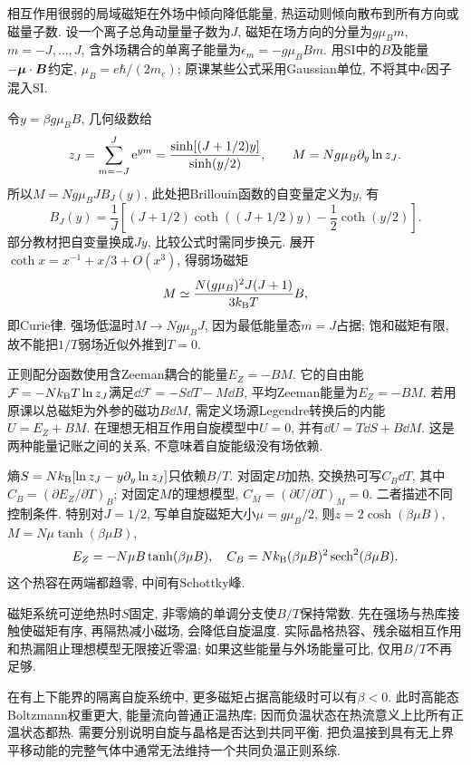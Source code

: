 \label{ch:magnetism}
相互作用很弱的局域磁矩在外场中倾向降低能量, 热运动则倾向散布到所有方向或磁量子数. 设一个离子总角动量量子数为$J$, 磁矩在场方向的分量为$g\mu_Bm$, $m=-J,\ldots,J$, 含外场耦合的单离子能量为$\epsilon_m=-g\mu_BBm$. 用SI中的$B$及能量$-\boldsymbol{\mu}\cdot\boldsymbol{B}$约定, $\mu_B=e\hbar/(2m_e)$; 原课某些公式采用Gaussian单位, 不将其中$c$因子混入SI.

令$y=\beta g\mu_BB$, 几何级数给
\[
z_J=\sum_{m=-J}^J\mathrm e^{ym}
=\frac{\sinh[(J+1/2)y]}{\sinh(y/2)},\qquad
M=Ng\mu_B\partial_y\ln z_J.
\]
所以$M=Ng\mu_BJ B_J(y)$, 此处把Brillouin函数的自变量定义为$y$, 有
\[
B_J(y)=\frac1J\left[(J+1/2)\coth((J+1/2)y)-\frac12\coth(y/2)\right].
\]
部分教材把自变量换成$Jy$, 比较公式时需同步换元. 展开$\coth x=x^{-1}+x/3+O(x^3)$, 得弱场磁矩
\[
M\simeq\frac{N(g\mu_B)^2J(J+1)}{3k_{\mathrm B} T}B,
\]
即Curie律. 强场低温时$M\to Ng\mu_BJ$, 因为最低能量态$m=J$占据; 饱和磁矩有限, 故不能把$1/T$弱场近似外推到$T=0$.

正则配分函数使用含Zeeman耦合的能量$E_Z=-BM$. 它的自由能$\mathcal F=-Nk_{\mathrm B} T\ln z_J$满足$\dd\mathcal F=-S\dd T-M\dd B$, 平均Zeeman能量为$E_Z=-BM$. 若用原课以总磁矩为外参的磁功$B\dd M$, 需定义场源Legendre转换后的内能$U=E_Z+BM$. 在理想无相互作用自旋模型中$U=0$, 并有$\dd U=T\dd S+B\dd M$. 这是两种能量记账之间的关系, 不意味着自旋能级没有场依赖.

熵$S=Nk_{\mathrm B}[\ln z_J-y\partial_y\ln z_J]$只依赖$B/T$. 对固定$B$加热, 交换热可写$C_B\dd T$, 其中$C_B=(\partial E_Z/\partial T)_B$; 对固定$M$的理想模型, $C_M=(\partial U/\partial T)_M=0$. 二者描述不同控制条件. 特别对$J=1/2$, 写单自旋磁矩大小$\mu=g\mu_B/2$, 则$z=2\cosh(\beta\mu B)$, $M=N\mu\tanh(\beta\mu B)$,
\[
E_Z=-N\mu B\tanh(\beta\mu B),\quad
C_B=Nk_{\mathrm B}(\beta\mu B)^2\operatorname{sech}^2(\beta\mu B).
\]
这个热容在两端都趋零, 中间有Schottky峰.

磁矩系统可逆绝热时$S$固定, 非零熵的单调分支使$B/T$保持常数. 先在强场与热库接触使磁矩有序, 再隔热减小磁场, 会降低自旋温度. 实际晶格热容、残余磁相互作用和热漏阻止理想模型无限接近零温; 如果这些能量与外场能量可比, 仅用$B/T$不再足够.

在有上下能界的隔离自旋系统中, 更多磁矩占据高能级时可以有$\beta<0$. 此时高能态Boltzmann权重更大, 能量流向普通正温热库; 因而负温状态在热流意义上比所有正温状态都热. 需要分别说明自旋与晶格是否达到共同平衡. 把负温接到具有无上界平移动能的完整气体中通常无法维持一个共同负温正则系综.
